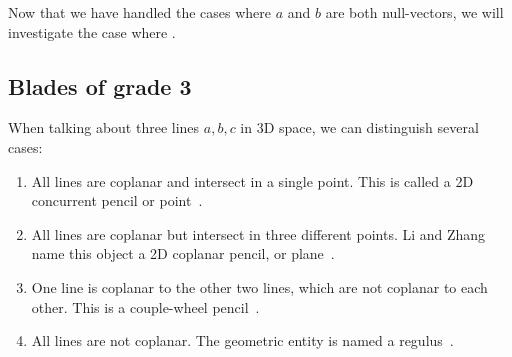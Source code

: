 Now that we have handled the cases where $a$ and $b$ are both null-vectors, we will investigate the case where .

\subsection{Blades of grade 3}
%
When talking about three lines $a, b, c$ in 3D space, we can distinguish several cases:

\begin{enumerate}[{Case} 1.]
  \item All lines are coplanar and intersect in a single point.  This is called a 2D concurrent pencil or point~\cite{Hongbo}.
  \item All lines are coplanar but intersect in three different points.  Li and Zhang name this object a 2D coplanar pencil, or plane~\cite{Hongbo}.
  \item One line is coplanar to the other two lines, which are not coplanar to each other.  This is a couple-wheel pencil~\cite{Hongbo}.
  \item All lines are not coplanar.  The geometric entity is named a regulus~\cite[Section 3.3]{Pottmann}.
\end{enumerate}

